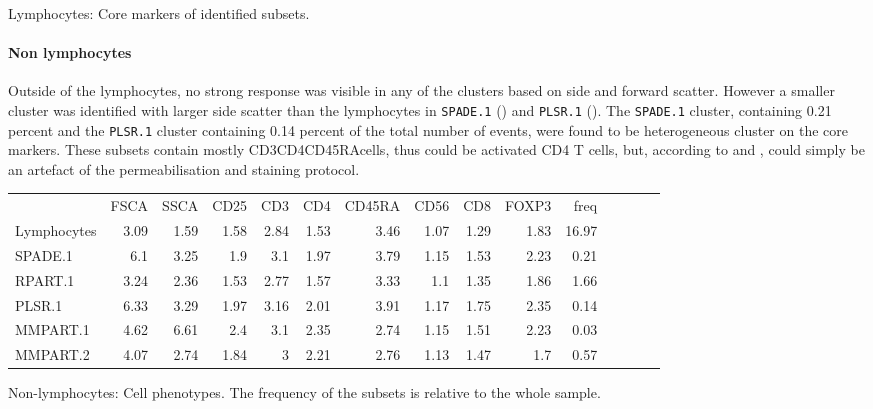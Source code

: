 { Lymphocytes: Core markers of identified subsets. }
{ }




\clearpage


\paragraph{Non lymphocytes}
Outside of the lymphocytes, no strong response was visible in any of the clusters based on side and forward scatter.
However a smaller cluster was identified with larger side scatter than the lymphocytes in \texttt{SPADE.1} () and \texttt{PLSR.1} ().
The \texttt{SPADE.1} cluster, containing 0.21 percent and the \texttt{PLSR.1} cluster containing 0.14 percent of the total number of events,
were found to be heterogeneous cluster on the core markers.
These subsets contain mostly CD3\positive CD4\positive CD45RA\positive cells, thus could be activated CD4 T cells,
but, according to  and , could simply be an artefact of the permeabilisation and staining protocol.


\begin{table}[h]\footnotesize
\centering
\begin{tabular}{lrrrrrrrrrrrrrr}
\rowcolor{Gray} 
            & FSCA & SSCA & CD25 & CD3  & CD4  & CD45RA & CD56 & CD8  & FOXP3 & freq \\
Lymphocytes & 3.09 & 1.59 & 1.58 & 2.84 & 1.53 & 3.46   & 1.07 & 1.29 & 1.83  & 16.97 \\
SPADE.1     & 6.1  & 3.25 & 1.9  & 3.1  & 1.97 & 3.79   & 1.15 & 1.53 & 2.23  & 0.21 \\
RPART.1     & 3.24 & 2.36 & 1.53 & 2.77 & 1.57 & 3.33   & 1.1  & 1.35 & 1.86  & 1.66 \\
PLSR.1      & 6.33 & 3.29 & 1.97 & 3.16 & 2.01 & 3.91   & 1.17 & 1.75 & 2.35  & 0.14 \\
MMPART.1    & 4.62 & 6.61 & 2.4  & 3.1  & 2.35 & 2.74   & 1.15 & 1.51 & 2.23  & 0.03 \\
MMPART.2    & 4.07 & 2.74 & 1.84 & 3    & 2.21 & 2.76   & 1.13 & 1.47 & 1.7   & 0.57 \\
\end{tabular}
{ Non-lymphocytes: Cell phenotypes. }
{ The frequency of the subsets is relative to the whole sample. }
\end{table}


